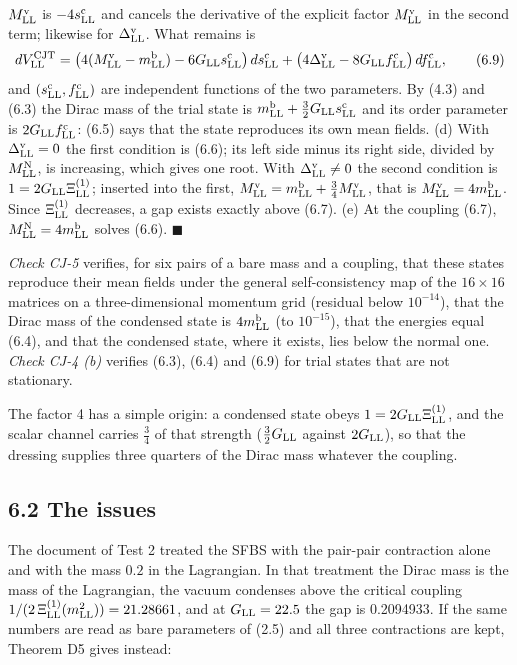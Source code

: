 \documentclass[
  10pt,
]{article}
\begin{document}
\(M^{\rm v}_{\rm LL}\) is \(-4s^{\rm c}_{\rm LL}\) and cancels the
derivative of the explicit factor \(M^{\rm v}_{\rm LL}\) in the second
term; likewise for \(\Delta^{\rm v}_{\rm LL}\). What remains is
\[dV^{\rm CJT}_{\rm LL}=\big(4(M^{\rm v}_{\rm LL}-m^{\rm b}_{\rm LL})-6G_{\rm LL}s^{\rm c}_{\rm LL}\big)\,ds^{\rm c}_{\rm LL}
+\big(4\Delta^{\rm v}_{\rm LL}-8G_{\rm LL}f^{\rm c}_{\rm LL}\big)\,df^{\rm c}_{\rm LL},\tag{6.9}\]
and \((s^{\rm c}_{\rm LL},f^{\rm c}_{\rm LL})\) are independent
functions of the two parameters. By (4.3) and (6.3) the Dirac mass of
the trial state is
\(m^{\rm b}_{\rm LL}+\tfrac32G_{\rm LL}s^{\rm c}_{\rm LL}\) and its
order parameter is \(2G_{\rm LL}f^{\rm c}_{\rm LL}\): (6.5) says that
the state reproduces its own mean fields. (d) With
\(\Delta^{\rm v}_{\rm LL}=0\) the first condition is (6.6); its left
side minus its right side, divided by \(M^{\rm N}_{\rm LL}\), is
increasing, which gives one root. With \(\Delta^{\rm v}_{\rm LL}\ne0\)
the second condition is \(1=2G_{\rm LL}\Xi^{(1)}_{\rm LL}\); inserted
into the first,
\(M^{\rm v}_{\rm LL}=m^{\rm b}_{\rm LL}+\tfrac34M^{\rm v}_{\rm LL}\),
that is \(M^{\rm v}_{\rm LL}=4m^{\rm b}_{\rm LL}\). Since
\(\Xi^{(1)}_{\rm LL}\) decreases, a gap exists exactly above (6.7). (e)
At the coupling (6.7), \(M^{\rm N}_{\rm LL}=4m^{\rm b}_{\rm LL}\) solves
(6.6). \(\blacksquare\)

\emph{Check CJ-5} verifies, for six pairs of a bare mass and a coupling,
that these states reproduce their mean fields under the general
self-consistency map of the \(16\times16\) matrices on a
three-dimensional momentum grid (residual below \(10^{-14}\)), that the
Dirac mass of the condensed state is \(4m^{\rm b}_{\rm LL}\) (to
\(10^{-15}\)), that the energies equal (6.4), and that the condensed
state, where it exists, lies below the normal one. \emph{Check CJ-4 (b)}
verifies (6.3), (6.4) and (6.9) for trial states that are not
stationary.

The factor 4 has a simple origin: a condensed state obeys
\(1=2G_{\rm LL}\Xi^{(1)}_{\rm LL}\), and the scalar channel carries
\(\tfrac34\) of that strength (\(\tfrac32G_{\rm LL}\) against
\(2G_{\rm LL}\)), so that the dressing supplies three quarters of the
Dirac mass whatever the coupling.

\hypertarget{the-issues}{%
\subsection{6.2 The issues}\label{the-issues}}

The document of Test 2 treated the SFBS with the pair-pair contraction
alone and with the mass \(0.2\) in the Lagrangian. In that treatment the
Dirac mass is the mass of the Lagrangian, the vacuum condenses above the
critical coupling \(1/(2\,\Xi^{(1)}_{\rm LL}(m_{\rm LL}^2))=21.28661\),
and at \(G_{\rm LL}=22.5\) the gap is 0.2094933. If the same numbers are
read as bare parameters of (2.5) and all three contractions are kept,
Theorem D5 gives instead:
\end{document}
